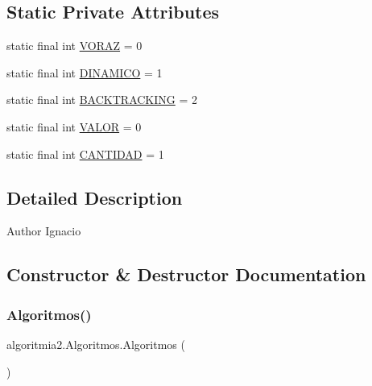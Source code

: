 \subsection*{Static Private Attributes}
\begin{DoxyCompactItemize}
\item 
static final int \mbox{\hyperlink{classalgoritmia2_1_1_algoritmos_a8ae81ffac3b3840d75bfd23ca04c8c13}{V\+O\+R\+AZ}} = 0
\item 
static final int \mbox{\hyperlink{classalgoritmia2_1_1_algoritmos_a03be4933b07018700a01755d828219e0}{D\+I\+N\+A\+M\+I\+CO}} = 1
\item 
static final int \mbox{\hyperlink{classalgoritmia2_1_1_algoritmos_a87404a6d3320e8a55fbca88378c43340}{B\+A\+C\+K\+T\+R\+A\+C\+K\+I\+NG}} = 2
\item 
static final int \mbox{\hyperlink{classalgoritmia2_1_1_algoritmos_afea17d73bc265fb529f4eb3555fa6605}{V\+A\+L\+OR}} = 0
\item 
static final int \mbox{\hyperlink{classalgoritmia2_1_1_algoritmos_ad995810a6a5db1b64e69a039c0137d2e}{C\+A\+N\+T\+I\+D\+AD}} = 1
\end{DoxyCompactItemize}


\subsection{Detailed Description}
\begin{DoxyAuthor}{Author}
Ignacio 
\end{DoxyAuthor}


\subsection{Constructor \& Destructor Documentation}
\mbox{\label{classalgoritmia2_1_1_algoritmos_af7746e9d1d89571233f5e9f05a429603}} 
\subsubsection{\texorpdfstring{Algoritmos()}{Algoritmos()}}
{\footnotesize\ttfamily algoritmia2.\+Algoritmos.\+Algoritmos (\begin{DoxyParamCaption}{ }\end{DoxyParamCaption})\hspace{0.3cm}{\ttfamily [inline]}}


